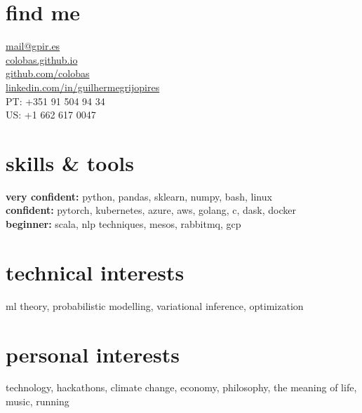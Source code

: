 \documentclass[]{colobas-cv}
\begin{document}

\begin{minipage}[t]{0.3\textwidth}
\section{find me}
  \vspace{7pt}
  \href{mailto:mail@gpir.es}{mail@gpir.es}\\
  \href{https://colobas.github.io}{colobas.github.io}\\
  \href{https://github.com/colobas}{github.com/colobas}\\
  \href{https://linkedin.com/in/guilhermegrijopires/}{linkedin.com/in/guilhermegrijopires}\\
  PT: +351 91 504 94 34\\
  US: +1 662 617 0047%
\end{minipage}
\hfill
\begin{minipage}[t]{0.3\textwidth}
\section{skills \& tools}
  \vspace{7pt}
  \textbf{very confident:} python, pandas, sklearn, numpy, bash, linux\\
  \textbf{confident:} pytorch, kubernetes, azure, aws, golang, c, dask, docker\\
  \textbf{beginner:} scala, nlp techniques, mesos, rabbitmq, gcp%
\end{minipage}
\hfill
\begin{minipage}[t]{0.3\textwidth}
\section{technical interests}
  \vspace{7pt}
  ml theory, probabilistic modelling, variational inference, optimization%
  \vspace{15pt}
\section{personal interests}
  \vspace{7pt}
  technology, hackathons, climate change, economy, philosophy, the meaning of life,
  music, running
\end{minipage}

\vspace{0.5cm}
\end{document}
